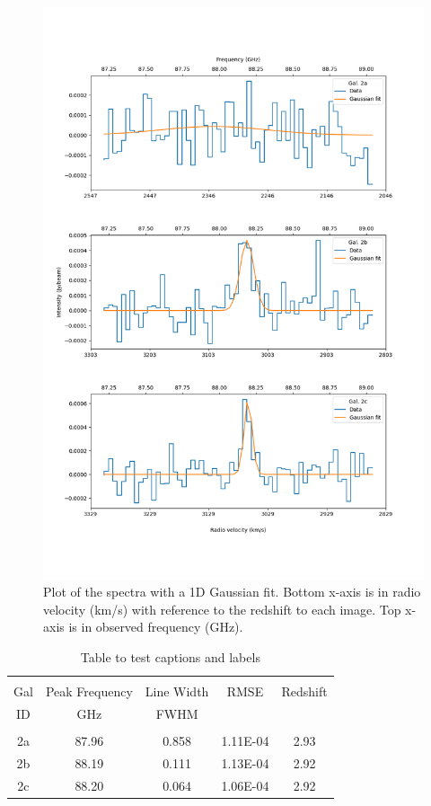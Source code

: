 \documentclass[11pt,letterpaper]{article}
\begin{document}
\begin{figure}[!htbp]
    \centering
    \includegraphics[width=0.8\linewidth]{../figs/redshift_axis_plot.png}
    \caption{Plot of the spectra with a 1D Gaussian fit. Bottom x-axis is in radio velocity (km/s) with reference to the redshift to each image. Top x-axis is in observed frequency (GHz).}
    \label{fig:redshift_axis}
\end{figure}

\begin{table}[!htbp]
\centering
\begin{tabular}{ccccc}
\hline \\[-0.25cm]
Gal & Peak Frequency & Line Width & RMSE & Redshift \\
ID  & GHz            & FWHM       &      & \\[0.1cm]
\hline \\[-0.25cm]
2a & 87.96 & 0.858 & 1.11E-04 & 2.93\\
2b & 88.19 & 0.111 & 1.13E-04 & 2.92\\
2c & 88.20 & 0.064 & 1.06E-04 & 2.92\\
\hline
\end{tabular}
\caption{Table to test captions and labels}
\label{table:1}
\end{table}
\end{document}
